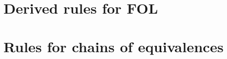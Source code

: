 \section{Derived rules for FOL}

\begin{multicols}{2}
\begin{fitchproof}
\end{fitchproof}
\begin{fitchproof}
\end{fitchproof}
\begin{fitchproof}
\end{fitchproof}
\begin{fitchproof}
\end{fitchproof}
\end{multicols}

\section{Rules for chains of equivalences}

